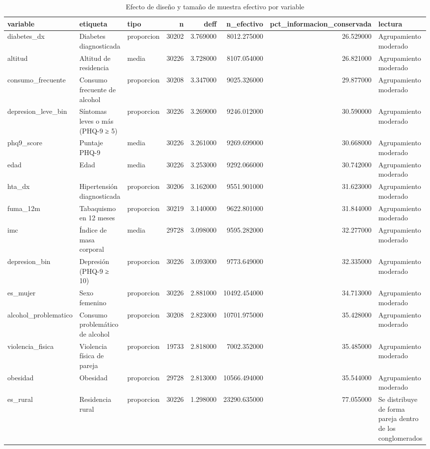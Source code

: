 \begin{table}[htbp]
\caption{Efecto de diseño y tamaño de muestra efectivo por variable}
\label{tab:tabla_51_deff_por_variable}
\begin{tabular}{lllrrrrl}
\toprule
variable & etiqueta & tipo & n & deff & n\_efectivo & pct\_informacion\_conservada & lectura \\
\midrule
diabetes\_dx & Diabetes diagnosticada & proporcion & 30202 & 3.769000 & 8012.275000 & 26.529000 & Agrupamiento moderado \\
altitud & Altitud de residencia & media & 30226 & 3.728000 & 8107.054000 & 26.821000 & Agrupamiento moderado \\
consumo\_frecuente & Consumo frecuente de alcohol & proporcion & 30208 & 3.347000 & 9025.326000 & 29.877000 & Agrupamiento moderado \\
depresion\_leve\_bin & Síntomas leves o más (PHQ-9 ≥ 5) & proporcion & 30226 & 3.269000 & 9246.012000 & 30.590000 & Agrupamiento moderado \\
phq9\_score & Puntaje PHQ-9 & media & 30226 & 3.261000 & 9269.699000 & 30.668000 & Agrupamiento moderado \\
edad & Edad & media & 30226 & 3.253000 & 9292.066000 & 30.742000 & Agrupamiento moderado \\
hta\_dx & Hipertensión diagnosticada & proporcion & 30206 & 3.162000 & 9551.901000 & 31.623000 & Agrupamiento moderado \\
fuma\_12m & Tabaquismo en 12 meses & proporcion & 30219 & 3.140000 & 9622.801000 & 31.844000 & Agrupamiento moderado \\
imc & Índice de masa corporal & media & 29728 & 3.098000 & 9595.282000 & 32.277000 & Agrupamiento moderado \\
depresion\_bin & Depresión (PHQ-9 ≥ 10) & proporcion & 30226 & 3.093000 & 9773.649000 & 32.335000 & Agrupamiento moderado \\
es\_mujer & Sexo femenino & proporcion & 30226 & 2.881000 & 10492.454000 & 34.713000 & Agrupamiento moderado \\
alcohol\_problematico & Consumo problemático de alcohol & proporcion & 30208 & 2.823000 & 10701.975000 & 35.428000 & Agrupamiento moderado \\
violencia\_fisica & Violencia física de pareja & proporcion & 19733 & 2.818000 & 7002.352000 & 35.485000 & Agrupamiento moderado \\
obesidad & Obesidad & proporcion & 29728 & 2.813000 & 10566.494000 & 35.544000 & Agrupamiento moderado \\
es\_rural & Residencia rural & proporcion & 30226 & 1.298000 & 23290.635000 & 77.055000 & Se distribuye de forma pareja dentro de los conglomerados \\
\bottomrule
\end{tabular}
\end{table}
